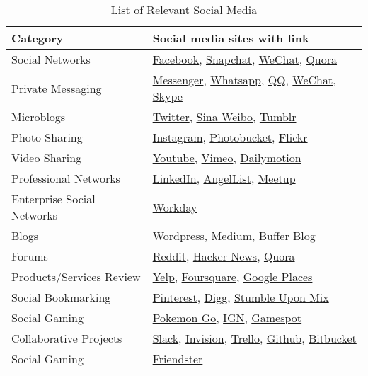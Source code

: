 \begin{table}[h]
\caption{List of Relevant Social Media}\vspace{-4mm}
{\small
\begin{tabular}{|l|l|} \hline
\textbf{Category} &  \textbf{Social media sites with link }\\\hline
Social Networks   &   \href{https://facebook.com}{Facebook}, \href{https://www.snapchat.com/}{Snapchat},  \href{https://www.wechat.com/en/}{WeChat}, \href{https://quora.com}{Quora}                     \\ \hline
Private Messaging & \href{https://messenger.com}{Messenger}, \href{https://whatsapp.com}{Whatsapp}, \href{http://www.imqq.com/}{QQ}, \href{https://www.wechat.com/en/}{WeChat}, \href{https://www.skype.com}{Skype} \\ \hline
Microblogs        &    \href{https://twitter.com}{Twitter}, \href{http://english.sina.com/weibo/}{Sina Weibo}, \href{https://tumblr.com}{Tumblr}           \\ \hline
Photo Sharing     &   \href{https://instagram.com}{Instagram}, \href{http://www.photobucket.com/}{Photobucket}, \href{https://flickr.com}{Flickr}  \\ \hline
Video Sharing     &   \href{https://www.youtube.com/}{Youtube}, \href{https://vimeo.com/}{Vimeo}, \href{https://www.dailymotion.com/us}{Dailymotion}  \\ \hline
Professional Networks &  \href{https://linkedin.com}{LinkedIn}, \href{https://angel.co/}{AngelList}, \href{http://www.meetup.com/}{Meetup}    \\ \hline
Enterprise Social Networks &  \href{https://www.workday.com/en-us/homepage.html}{Workday}   \\ \hline
Blogs             &  \href{https://wordpress.com}{Wordpress}, \href{https://medium.com}{Medium}, \href{https://buffer.com/}{Buffer Blog}   \\ \hline
Forums            &  \href{https://reddit.com}{Reddit}, \href{https://news.ycombinator.com}{Hacker News}, \href{https://quora.com}{Quora}    \\ \hline
Products/Services Review & \href{https://yelp.com}{Yelp}, \href{https://fourquare.com}{Foursquare}, \href{https://places.google.com}{Google Places} \\ \hline
Social Bookmarking &  \href{https://www.pinterest.com}{Pinterest}, \href{https://digg.com}{Digg}, \href{https://mix.com/}{Stumble Upon Mix}     \\ \hline
Social Gaming &    \href{https://www.pokemongo.com/en-us/}{Pokemon Go}, \href{https://www.ign.com/}{IGN}, \href{https://www.gamespot.com/}{Gamespot} \cite{gamestatista}       \\ \hline
Collaborative Projects &  \href{https://slack.com}{Slack}, \href{https://www.invisionapp.com/}{Invision}, \href{https://trello.com}{Trello}, \href{https://github.com}{Github}, \href{https://bitbucket.org/}{Bitbucket} \\ \hline
Social Gaming  &  \href{http://www.friendster.com/index.html}{Friendster} \\ \hline
\end{tabular}}
\label{table:social_media_list}
\end{table}

